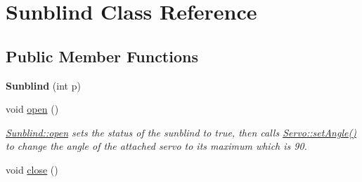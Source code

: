 \hypertarget{class_sunblind}{}\section{Sunblind Class Reference}
\label{class_sunblind}
\subsection*{Public Member Functions}
\begin{DoxyCompactItemize}
\item 
\hypertarget{class_sunblind_a38eeb348b974873737fb86c05fb65d56}{}{\bfseries Sunblind} (int p)\label{class_sunblind_a38eeb348b974873737fb86c05fb65d56}

\item 
\hypertarget{class_sunblind_a707f2bdcf9b98b362f1f71d05ff85465}{}void \hyperlink{class_sunblind_a707f2bdcf9b98b362f1f71d05ff85465}{open} ()\label{class_sunblind_a707f2bdcf9b98b362f1f71d05ff85465}

\begin{DoxyCompactList}\small\item\em \hyperlink{class_sunblind_a707f2bdcf9b98b362f1f71d05ff85465}{Sunblind\+::open} sets the status of the sunblind to true, then calls \hyperlink{class_servo_aa8ccde828af12dfd201d716fbfe7a13e}{Servo\+::set\+Angle()} to change the angle of the attached servo to it\textquotesingle{}s maximum which is 90. \end{DoxyCompactList}\item 
\hypertarget{class_sunblind_a4f5157b03235dbd04d2e9d23e5947b05}{}void \hyperlink{class_sunblind_a4f5157b03235dbd04d2e9d23e5947b05}{close} ()\label{class_sunblind_a4f5157b03235dbd04d2e9d23e5947b05}


\end{DoxyCompactItemize}
